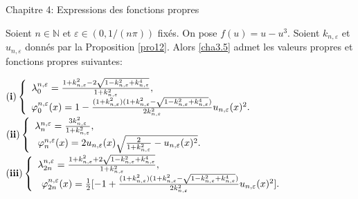 \documentclass[mathserif,10pt]{beamer}
\begin{document}
 \begin{frame}{Chapitre 4: Expressions des fonctions propres } \transglitter[duration=1]
\begin{theorem}\label{th1}
Soient $n \in \mathbb{N}$ et $\varepsilon \in (0,1/(n\pi ))$ fixés. 
On pose $f(u)=u-u^{3}$.
Soient $k_{n,\varepsilon }$ et $u_{n,\varepsilon }$ donnés par la Proposition \ref{pro12}. 
Alors \eqref{cha3.5} admet les valeurs propres et fonctions propres suivantes: 

$\mathbf{(i)}\left\{ \begin{array}{c}
\lambda_{0}^{n,\varepsilon } = \frac{1+k_{n,\varepsilon }^{2}-
2\sqrt{1-k_{n,\varepsilon }^{2}+k_{n,\varepsilon }^{4}}}{1+k_{n,\varepsilon }^{2}},
\hspace*{4.5cm} \\
\hspace*{-1cm}\varphi_{0}^{n,\varepsilon }(x) =1-\frac{(1+k_{n,\varepsilon }^{2} )(1+k_{n,\varepsilon }^{2}-\sqrt{1-k_{n,\varepsilon }^{2}+k_{n,\varepsilon }^{4} })}{2k_{n,\varepsilon }^{2} }u_{n,\varepsilon}(x)^{2}.
\end{array}\right.
$
$\mathbf{(ii)}\left\{ \begin{array}{c}
\lambda_{n}^{n,\varepsilon } =\frac{3k_{n,\varepsilon }^{2}}{1+k_{n,\varepsilon }^{2} },
\hspace*{5cm} \\
\hspace*{-1cm}\varphi_{n}^{n,\varepsilon }(x)=2u_{n,\varepsilon }(x)\sqrt{\frac{2}{1+k_{n,\varepsilon }^{2}}-u_{n,\varepsilon }(x)^{2}}.
\end{array}\right.
$
$\mathbf{(iii)}\left\{ \begin{array}{c}
\lambda_{2n}^{n,\varepsilon } = \frac{1+k_{n,\varepsilon }^{2}+
2\sqrt{1-k_{n,\varepsilon }^{2}+k_{n,\varepsilon }^{4}}}{1+k_{n,\varepsilon }^{2}},
\hspace*{5.5cm} \\
\hspace*{-1cm}\varphi_{2n}^{n,\varepsilon }(x)=\frac{1}{2}[-1+\frac{(1+k_{n,\varepsilon }^{2} )(1+k_{n,\varepsilon }^{2}-\sqrt{1-k_{n,\varepsilon }^{2}+k_{n,\varepsilon }^{4} })}{2k_{n,\varepsilon }^{2} }u_{n,\varepsilon}(x)^{2}].
\end{array}\right.
$
\end{theorem} 
\end{frame}
\end{document}
